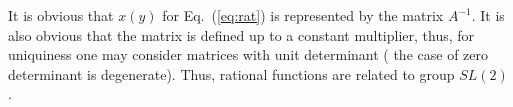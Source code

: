 \documentclass{article}
\begin{document}
It is obvious that  $x(y)$ for  Eq.~(\ref{eq:rat}) is represented by the matrix $A^{-1}$. It is also obvious that the matrix is defined up to a constant multiplier, thus, for uniquiness one may consider matrices with unit determinant ( the case of zero determinant is degenerate). Thus, rational functions are related to group $SL(2)$.
\end{document}
